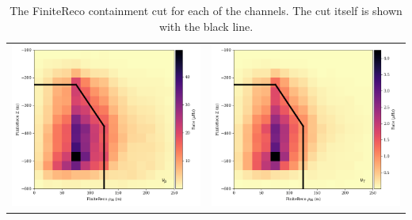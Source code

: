 \begin{center}
\begin{table}
\begin{tabular}{cc}
    \includegraphics[width=0.45\linewidth]{z_rho_genie_numu.png} &  
    \includegraphics[width=0.45\linewidth]{z_rho_genie_nutau.png} \\ 
\end{tabular}
\label{fig:finitereco_zVsRho}
\caption{The FiniteReco containment cut for each of the channels. The cut itself is shown with the black line.}
\end{table}
\end{center}

